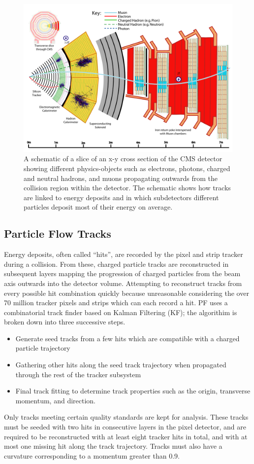 \begin{figure}[htbp]
\centering
     \includegraphics[width=1.0\textwidth]{object_reconstruction_and_selection/plots/cms_slice.pdf}
     \caption{
A schematic of a slice of an x-y cross section of the CMS detector showing different
physics-objects such as electrons, photons, charged and neutral hadrons, and muons
propagating outwards from the collision region within the detector. The schematic
shows how tracks are linked to energy deposits and in which subdetectors different
particles deposit most of their energy on average.
     }
     \label{fig:cms_slice}
\end{figure}


\subsection{Particle Flow Tracks}
\label{sec:pf_tracks}
Energy deposits, often called ``hits'', are recorded by the pixel and strip tracker during
a collision. From these, charged particle tracks are reconstructed in subsequent layers
mapping the progression of charged particles from the beam axis outwards into the detector
volume. Attempting to reconstruct tracks from every possible hit combination quickly
because unreasonable considering the over 70 million tracker pixels and strips which can
each record a hit. PF uses a combinatorial track finder based on Kalman 
Filtering (KF); the algorithim is broken down into three successive steps.
\begin{itemize}
\item Generate seed tracks from a few hits which are compatible with a charged
particle trajectory
\item Gathering other hits along the seed track trajectory when propagated through
the rest of the tracker subsystem
\item Final track fitting to determine track properties such as the origin, transverse
momentum, and direction.
\end{itemize}
Only tracks meeting certain quality standards are kept for analysis. These tracks must
be seeded with two hits in consecutive layers in the pixel detector, and are required 
to be reconstructed with at least eight tracker hits in total, and with at most one 
missing hit along the track trajectory. Tracks must also have a curvature corresponding
to a momentum greater than 0.9\GeV.

